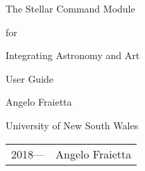 \documentclass[10pt,a4paper,extrafontsizes]{memoir}
\newcommand{\PWnote}[2]{}
\begin{document}





\firmlists
\midsloppy
\raggedbottom
{}




\frontmatter
\pagestyle{empty}


\vspace*{\fill}
\begin{center}
\HUGE\textsf{The Stellar Command Module}\par
\end{center}
\begin{center}
\LARGE\textsf{for}\par
\end{center}
\begin{center}
\HUGE\textsf{Integrating Astronomy and Art}\par
\end{center}

\begin{center}
\Huge\textsf{User Guide}\par
\end{center}
\begin{center}
\LARGE\textsf{Angelo Fraietta}\par
\bigskip
\LARGE\textsf{University of New South Wales}\par
\medskip

\end{center}
\vspace*{\fill}
\def\THP{T\kern-0.2em H\kern-0.4em P}%
\def\THP{T\kern-0.15em H\kern-0.3em P}%
\newcommand*{\THPress}{The Herries Press}%
\begin{center}

\setlength{\droptitle}{0pt}%
\end{center}
\clearpage

\PWnote{2009/06/26}{Updated the copyright page for 9th impression}
\begingroup
\footnotesize
\setlength{\parindent}{0pt}
\setlength{\parskip}{\baselineskip}


\begin{tabular}{@{} l l}
  \textcopyright{} 2018\:---\:2019 &Angelo Fraietta \\
\end{tabular}
\end{document}
